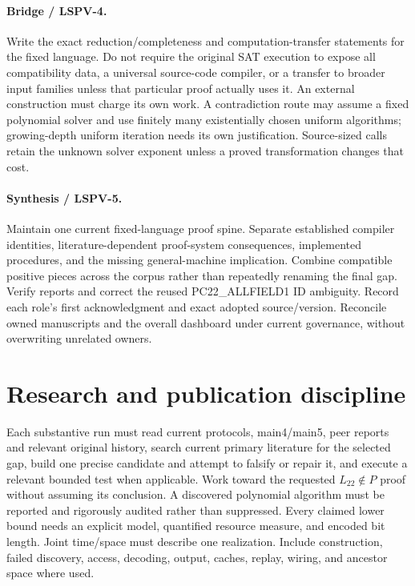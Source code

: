 \documentclass[11pt]{article}
\begin{document}
\paragraph{Bridge / LSPV-4.}
Write the exact reduction/completeness and computation-transfer statements for the fixed language. Do not require the original SAT execution to expose all compatibility data, a universal source-code compiler, or a transfer to broader input families unless that particular proof actually uses it. An external construction must charge its own work. A contradiction route may assume a fixed polynomial solver and use finitely many existentially chosen uniform algorithms; growing-depth uniform iteration needs its own justification. Source-sized calls retain the unknown solver exponent unless a proved transformation changes that cost.

\paragraph{Synthesis / LSPV-5.}
Maintain one current fixed-language proof spine. Separate established compiler identities, literature-dependent proof-system consequences, implemented procedures, and the missing general-machine implication. Combine compatible positive pieces across the corpus rather than repeatedly renaming the final gap. Verify reports and correct the reused PC22\_ALLFIELD1 ID ambiguity. Record each role's first acknowledgment and exact adopted source/version. Reconcile owned manuscripts and the overall dashboard under current governance, without overwriting unrelated owners.

\section{Research and publication discipline}
Each substantive run must read current protocols, main4/main5, peer reports and relevant original history, search current primary literature for the selected gap, build one precise candidate and attempt to falsify or repair it, and execute a relevant bounded test when applicable. Work toward the requested $L_{22}\notin P$ proof without assuming its conclusion. A discovered polynomial algorithm must be reported and rigorously audited rather than suppressed. Every claimed lower bound needs an explicit model, quantified resource measure, and encoded bit length. Joint time/space must describe one realization. Include construction, failed discovery, access, decoding, output, caches, replay, wiring, and ancestor space where used.
\end{document}
